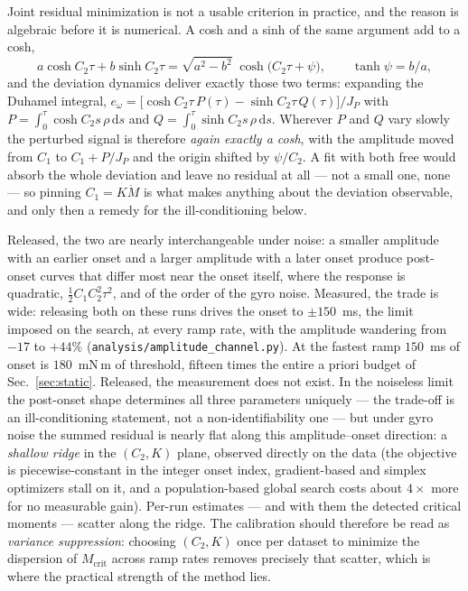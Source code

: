 \documentclass[10pt]{article}
\begin{document}
Joint residual minimization is not a usable criterion in practice, and
the reason is algebraic before it is numerical. A cosh and a sinh of the
same argument add to a cosh,
\begin{equation}
a\cosh C_2\tau + b\sinh C_2\tau
 = \sqrt{a^2 - b^2}\;\cosh\!\bigl(C_2\tau + \psi\bigr),
\qquad \tanh\psi = b/a ,
\label{eq:coshsum}
\end{equation}
and the deviation dynamics deliver exactly those two terms: expanding
the Duhamel integral,
$e_\omega = \bigl[\cosh C_2\tau\,P(\tau)
 - \sinh C_2\tau\,Q(\tau)\bigr]/J_P$ with
$P = \int_0^\tau\!\cosh C_2 s\,\rho\,\mathrm{d}s$ and
$Q = \int_0^\tau\!\sinh C_2 s\,\rho\,\mathrm{d}s$. Wherever $P$ and $Q$
vary slowly the perturbed signal is therefore \emph{again exactly a
cosh}, with the amplitude moved from $C_1$ to $C_1 + P/J_P$ and the
origin shifted by $\psi/C_2$. A fit with both free would absorb the
whole deviation and leave no residual at all — not a small one, none —
so pinning $C_1 = K\dot M$ is what makes anything about the deviation
observable, and only then a remedy for the ill-conditioning below.

Released, the two are nearly interchangeable under noise: a smaller
amplitude with an earlier onset and a larger amplitude with a later
onset produce post-onset curves that differ most near the onset itself,
where the response is quadratic, $\tfrac12 C_1 C_2^2\tau^2$, and of the
order of the gyro noise. Measured, the trade is wide: releasing both on
these runs drives the onset to $\pm150$~ms, the limit imposed on the
search, at every ramp rate, with the amplitude wandering from $-17$ to
$+44\%$ (\texttt{analysis/amplitude\_channel.py}). At the fastest ramp
$150$~ms of onset is $180$~mN\,m of threshold, fifteen times the entire
a priori budget of Sec.~\ref{sec:static}. Released, the measurement does
not exist. In the noiseless limit the post-onset shape determines all
three parameters uniquely — the trade-off is an ill-conditioning
statement, not a non-identifiability one — but under gyro noise the
summed residual is nearly flat along this amplitude--onset direction:
a \emph{shallow ridge} in the $(C_2, K)$ plane, observed directly on
the data (the objective is piecewise-constant in the integer onset
index, gradient-based and simplex optimizers stall on it, and a
population-based global search costs about $4\times$ more for no
measurable gain). Per-run estimates — and with them the detected
critical moments — scatter along the ridge. The calibration should
therefore be read as \emph{variance suppression}: choosing $(C_2, K)$
once per dataset to minimize the dispersion of $M_{\mathrm{crit}}$
across ramp rates removes precisely that scatter, which is where the
practical strength of the method lies.
\end{document}
